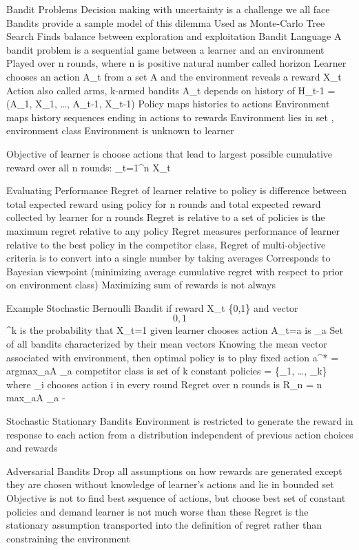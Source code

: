 Bandit Problems
	Decision making with uncertainty is a challenge we all face
		Bandits provide a sample model of this dilemma
	Used as Monte-Carlo Tree Search
	Finds balance between exploration and exploitation
Bandit Language
	A bandit problem is a sequential game between a learner and an environment
	Played over n rounds, where n is positive natural number called horizon
	Learner chooses an action A_{t} from a set A and the environment reveals a reward X_{t} \in \doubleR
	Action also called arms, k-armed bandits
	A_{t} depends on history of H_{t-1} = (A_{1}, X_{1}, \dots, A_{t-1}, X_{t-1})
	Policy maps histories to actions
	Environment maps history sequences ending in actions to rewards
	Environment lies in set \epsilon, environment class
	Environment is unknown to learner

	Objective of learner is choose actions that lead to largest possible cumulative reward over all n rounds: \sum_{t=1}^{n} X_{t}

Evaluating Performance
	Regret of learner relative to policy \pi is difference between total expected reward using policy \pi for n rounds and total expected reward collected by learner for n rounds
		Regret is relative to a set of policies \prod is the maximum regret relative to any policy \pi \in \prod
		Regret measures performance of learner relative to the best policy in the competitor class, \prod
	Regret of multi-objective criteria is to convert into a single number by taking averages
		Corresponds to Bayesian viewpoint (minimizing average cumulative regret with respect to prior on environment class)
	Maximizing sum of rewards is not always

Example
	Stochastic Bernoulli Bandit if reward X_{t} \in \{0,1\} and vector \mu \in \[0,1\]^{k} is the probability that X_{t}=1 given learner chooses action A_{t}=a is \mu_{a}
		Set of all bandits characterized by their mean vectors
		Knowing the mean vector associated with environment, then optimal policy is to play fixed action a^{*} = argmax_{a\in A} \mu_{a}
			competitor class is set of k constant policies \prod = \{\pi_{1}, \dots, \pi_{k}\} where \pi_{i} chooses action i in every round
				Regret over n rounds is R_{n} = n max_{a\in A} \mu_{a} - \doubleE [\sum_{t=1}^{n} X_{t}]

Stochastic Stationary Bandits
	Environment is restricted to generate the reward in response to each action from a distribution independent of previous action choices and rewards


Adversarial Bandits
	Drop all assumptions on how rewards are generated except they are chosen without knowledge of learner's actions and lie in bounded set
		Objective is not to find best sequence of actions, but choose best set of constant policies and demand learner is not much worse than these
		Regret is the stationary assumption transported into the definition of regret rather than constraining the environment

